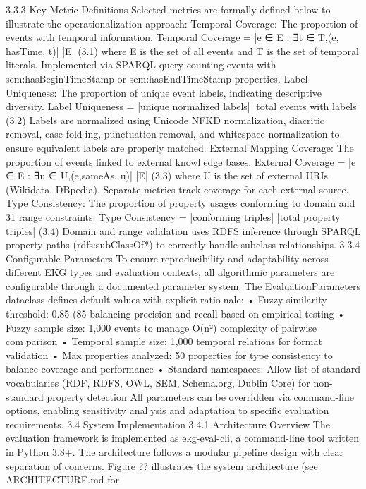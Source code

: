 3.3.3 Key Metric Definitions
Selected metrics are formally defined below to illustrate the operationalization approach:
Temporal Coverage: The proportion of events with temporal information.
Temporal Coverage = |{e ∈ E : ∃t ∈ T,(e, hasTime, t)}|
|E|
(3.1)
where E is the set of all events and T is the set of temporal literals. Implemented via
SPARQL query counting events with sem:hasBeginTimeStamp or sem:hasEndTimeStamp
properties.
Label Uniqueness: The proportion of unique event labels, indicating descriptive
diversity.
Label Uniqueness = |unique normalized labels|
|total events with labels|
(3.2)
Labels are normalized using Unicode NFKD normalization, diacritic removal, case folding, punctuation removal, and whitespace normalization to ensure equivalent labels are
properly matched.
External Mapping Coverage: The proportion of events linked to external knowledge bases.
External Coverage = |{e ∈ E : ∃u ∈ U,(e,sameAs, u)}|
|E|
(3.3)
where U is the set of external URIs (Wikidata, DBpedia). Separate metrics track coverage
for each external source.
Type Consistency: The proportion of property usages conforming to domain and
31
range constraints.
Type Consistency = |conforming triples|
|total property triples|
(3.4)
Domain and range validation uses RDFS inference through SPARQL property paths
(rdfs:subClassOf*) to correctly handle subclass relationships.
3.3.4 Configurable Parameters
To ensure reproducibility and adaptability across different EKG types and evaluation
contexts, all algorithmic parameters are configurable through a documented parameter
system. The EvaluationParameters dataclass defines default values with explicit rationale:
• Fuzzy similarity threshold: 0.85 (85%
balancing precision and recall based on empirical testing
• Fuzzy sample size: 1,000 events to manage O(n²) complexity of pairwise comparison
• Temporal sample size: 1,000 temporal relations for format validation
• Max properties analyzed: 50 properties for type consistency to balance coverage
and performance
• Standard namespaces: Allow-list of standard vocabularies (RDF, RDFS, OWL,
SEM, Schema.org, Dublin Core) for non-standard property detection
All parameters can be overridden via command-line options, enabling sensitivity analysis and adaptation to specific evaluation requirements.
3.4 System Implementation
3.4.1 Architecture Overview
The evaluation framework is implemented as ekg-eval-cli, a command-line tool written
in Python 3.8+. The architecture follows a modular pipeline design with clear separation
of concerns. Figure ?? illustrates the system architecture (see ARCHITECTURE.md for
